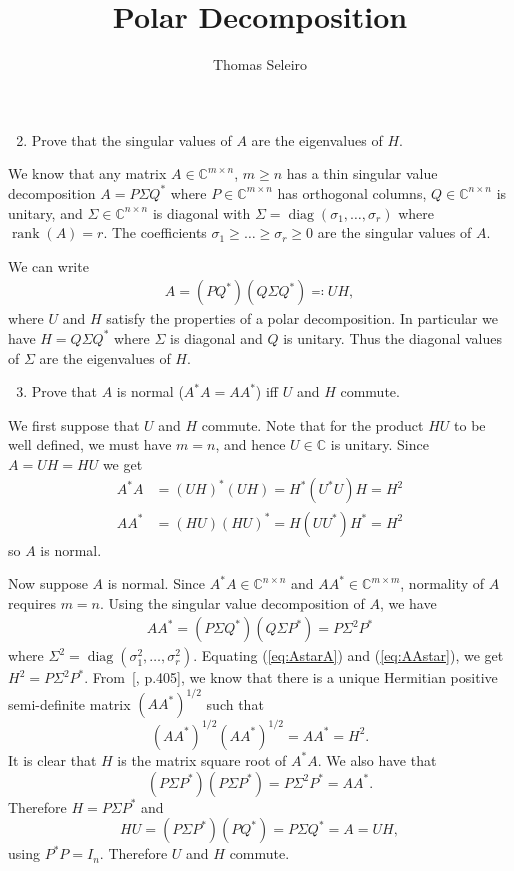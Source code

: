 \documentclass[10pt, A4paper]{article}
\newcommand{\mxm}{m \times m}
\newcommand{\mxn}{m \times n}
\newcommand{\nxn}{n \times n}
\DeclareMathOperator{\diag}{diag}
\DeclareMathOperator{\rank}{rank}
\begin{document}
\title{Polar Decomposition}
\author{Thomas Seleiro}
\maketitle


\begin{enumerate}
	\setcounter{enumi}{1}
	\item Prove that the singular values of $A$ are the eigenvalues of $H$.
\end{enumerate}

We know that any matrix $A\in\mathbb{C}^{\mxn}$, $m\geq n$ has 
a thin singular value decomposition $A = P \Sigma Q^*$ where $P \in
\mathbb{C}^{\mxn}$ has orthogonal columns, $Q \in 
\mathbb{C}^{\nxn}$ is unitary, and $\Sigma \in 
\mathbb{C}^{\nxn}$ is diagonal with $\Sigma = \diag(\sigma_1, 
\ldots, \sigma_r)$ where $\rank(A) = r$. The coefficients $\sigma_1 
\geq \ldots \geq \sigma_r \geq 0$ are the singular values of $A$.

We can write
\begin{align}
	A = (PQ^*) (Q \Sigma Q^*) \eqqcolon UH,
	\label{eq:PolarSVD}
\end{align}
where $U$ and $H$ satisfy the properties of a polar decomposition.
In particular we have $H = Q \Sigma Q^*$ where $\Sigma$ is diagonal and 
$Q$ is unitary. Thus the diagonal values of $\Sigma$ are the 
eigenvalues of $H$.





\vspace{0.2cm}
\begin{enumerate}
	\setcounter{enumi}{2}
	\item Prove that $A$ is normal ($A^*A = AA^*$) iff $U$ and $H$
	commute.
\end{enumerate}

We first suppose that $U$ and $H$ commute. Note that for the product
$HU$ to be well defined, we must have $m = n$, and hence
$U\in\mathbb{C}$ is unitary. Since $A = UH = HU$ we get
\begin{align}
	\label{eq:AstarA}
	A^*A &= (UH)^* (UH) = H^*(U^*U)H = H^2 \\
	AA^* &= (HU) (HU)^* = H(UU^*)H^* = H^2
\end{align}
so $A$ is normal.

Now suppose $A$ is normal. Since $A^*A \in \mathbb{C}^{n\times n}$ and
$AA^* \in \mathbb{C}^{\mxm}$, normality of $A$ requires $m=n$.
Using the singular value decomposition of $A$, we have
\begin{align}
	AA^* = (P\Sigma Q^*) (Q\Sigma P^*) = P\Sigma^2 P^*
	\label{eq:AAstar}
\end{align}
where $\Sigma^2 = \diag(\sigma_1^2, \ldots,\sigma_r^2)$.
Equating (\ref{eq:AstarA}) and (\ref{eq:AAstar}), we get 
$H^2 = P\Sigma^2P^*$. From~[\citealp{hojo1985}, p.405], we know 
that there
is a unique Hermitian positive semi-definite matrix $(AA^*)^{1/2}$ such 
that $$(AA^*)^{1/2}(AA^*)^{1/2} = AA^* = H^2.$$
It is clear that $H$ is the matrix square root of $A^*A$.
We also have that
$$(P\Sigma P^*) (P\Sigma P^*) = P \Sigma^2P^* = AA^*.$$
Therefore $H = P\Sigma P^*$ and
$$HU = (P\Sigma P^*) (PQ^*) = P \Sigma Q^* = A = UH,$$
using $P^*P = I_n$. Therefore $U$ and $H$ commute.
 
\end{document}
